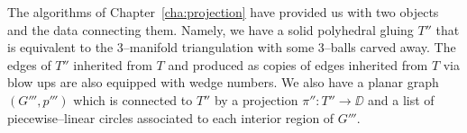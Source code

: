 The algorithms of Chapter~\ref{cha:projection} have provided us with two objects and the data connecting them.
Namely, we have a solid polyhedral gluing $T''$ that is equivalent to the 3--manifold triangulation with some 3--balls carved away.
The edges of $T''$ inherited from $T$ and produced as copies of edges inherited from $T$ via blow ups are also equipped with wedge numbers.
We also have a planar graph $(G''',p''')$ which is connected to $T''$ by a projection $\pi'':T''\to\DD$ and a list of piecewise--linear circles associated to each interior region of $G'''$.

